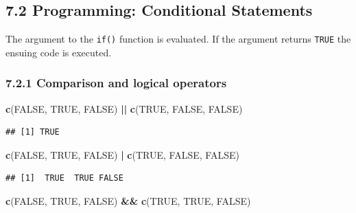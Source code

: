 \documentclass[]{article}
\newenvironment{Shaded}{\begin{snugshade}}{\end{snugshade}}
\newcommand{\KeywordTok}[1]{\textcolor[rgb]{0.13,0.29,0.53}{\textbf{#1}}}
\newcommand{\StringTok}[1]{\textcolor[rgb]{0.31,0.60,0.02}{#1}}
\newcommand{\OtherTok}[1]{\textcolor[rgb]{0.56,0.35,0.01}{#1}}
\newcommand{\OperatorTok}[1]{\textcolor[rgb]{0.81,0.36,0.00}{\textbf{#1}}}
\newcommand{\NormalTok}[1]{#1}
\begin{document}
\subsection{7.2 Programming: Conditional
Statements}\label{programming-conditional-statements}

The argument to the \texttt{if()} function is evaluated. If the argument
returns \texttt{TRUE} the ensuing code is executed.

\subsubsection{7.2.1 Comparison and logical
operators}\label{comparison-and-logical-operators}

\begin{Shaded}
\begin{Highlighting}[]
\KeywordTok{c}\NormalTok{(}\OtherTok{FALSE}\NormalTok{, }\OtherTok{TRUE}\NormalTok{, }\OtherTok{FALSE}\NormalTok{) }\OperatorTok{||}\StringTok{ }\KeywordTok{c}\NormalTok{(}\OtherTok{TRUE}\NormalTok{, }\OtherTok{FALSE}\NormalTok{, }\OtherTok{FALSE}\NormalTok{)}
\end{Highlighting}
\end{Shaded}

\begin{verbatim}
## [1] TRUE
\end{verbatim}

\begin{Shaded}
\begin{Highlighting}[]
\KeywordTok{c}\NormalTok{(}\OtherTok{FALSE}\NormalTok{, }\OtherTok{TRUE}\NormalTok{, }\OtherTok{FALSE}\NormalTok{) }\OperatorTok{|}\StringTok{ }\KeywordTok{c}\NormalTok{(}\OtherTok{TRUE}\NormalTok{, }\OtherTok{FALSE}\NormalTok{, }\OtherTok{FALSE}\NormalTok{)}
\end{Highlighting}
\end{Shaded}

\begin{verbatim}
## [1]  TRUE  TRUE FALSE
\end{verbatim}

\begin{Shaded}
\begin{Highlighting}[]
\KeywordTok{c}\NormalTok{(}\OtherTok{FALSE}\NormalTok{, }\OtherTok{TRUE}\NormalTok{, }\OtherTok{FALSE}\NormalTok{) }\OperatorTok{&&}\StringTok{ }\KeywordTok{c}\NormalTok{(}\OtherTok{TRUE}\NormalTok{, }\OtherTok{TRUE}\NormalTok{, }\OtherTok{FALSE}\NormalTok{)}
\end{Highlighting}
\end{Shaded}
\end{document}
